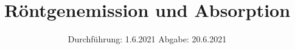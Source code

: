 

\subject{V602}
\title{Röntgenemission und Absorption}
\date{%
  Durchführung: 1.6.2021
  \hspace{3em}
  Abgabe: 20.6.2021
}



\maketitle
\thispagestyle{empty}
\tableofcontents
\newpage






\printbibliography{}



